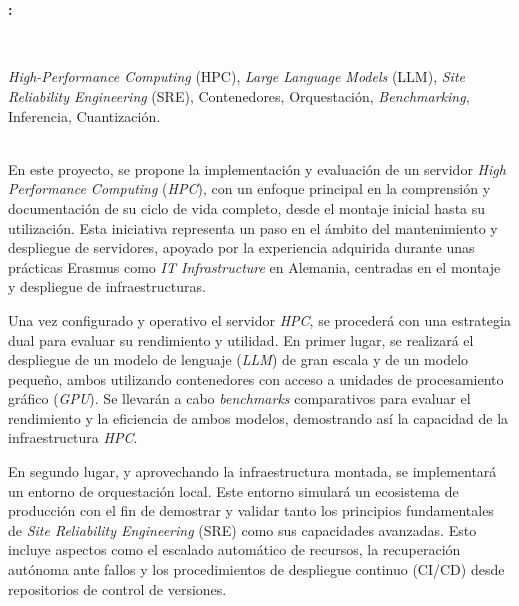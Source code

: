 \chapter*{}


%


\begin{center}
{\large\bfseries \myTitle:} \textit{\mySubTitle}\\
\end{center}
\begin{center}
\myName\\
\end{center}

\textit{High-Performance Computing} (HPC), \textit{Large Language Models} (LLM), \textit{Site Reliability Engineering} (SRE), Contenedores, Orquestación, \textit{Benchmarking}, Inferencia, Cuantización.

\vspace{0.7cm}
\\

En este proyecto, se propone la implementación y evaluación de un servidor \textit{High Performance Computing} (\textit{HPC}), con un enfoque principal en la comprensión y documentación de su ciclo de vida completo, desde el montaje inicial hasta su utilización. Esta iniciativa representa un paso en el ámbito del mantenimiento y despliegue de servidores, apoyado por la experiencia adquirida durante unas prácticas Erasmus como \textit{IT Infrastructure} en Alemania, centradas en el montaje y despliegue de infraestructuras.

Una vez configurado y operativo el servidor \textit{HPC}, se procederá con una estrategia dual para evaluar su rendimiento y utilidad. En primer lugar, se realizará el despliegue de un modelo de lenguaje (\textit{LLM}) de gran escala y de un modelo pequeño, ambos utilizando contenedores con acceso a unidades de procesamiento gráfico (\textit{GPU}). Se llevarán a cabo \textit{benchmarks} comparativos para evaluar el rendimiento y la eficiencia de ambos modelos, demostrando así la capacidad de la infraestructura \textit{HPC}.

En segundo lugar, y aprovechando la infraestructura montada, se implementará un entorno de orquestación local. Este entorno simulará un ecosistema de producción con el fin de demostrar y validar tanto los principios fundamentales de \textit{Site Reliability Engineering} (SRE) como sus capacidades avanzadas. Esto incluye aspectos como el escalado automático de recursos, la recuperación autónoma ante fallos y los procedimientos de despliegue continuo (CI/CD) desde repositorios de control de versiones.

